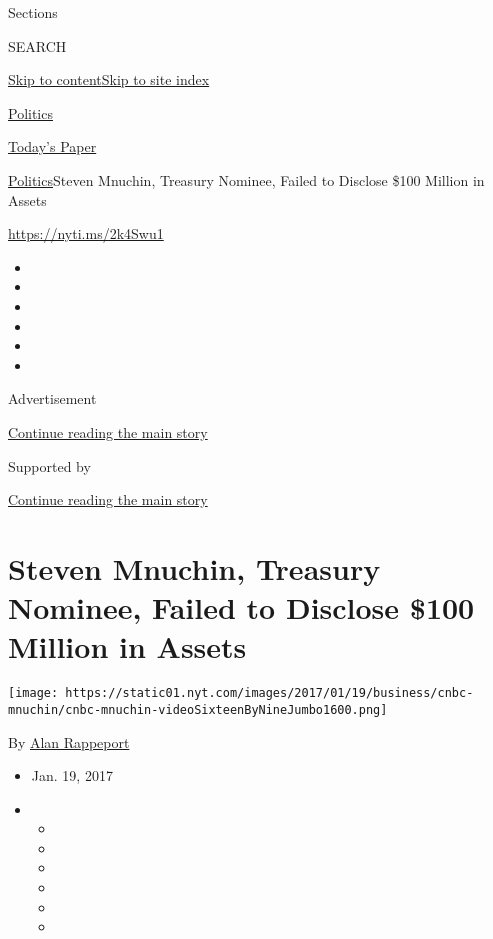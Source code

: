 Sections

SEARCH

\protect\hyperlink{site-content}{Skip to
content}\protect\hyperlink{site-index}{Skip to site index}

\href{https://www.nytimes.com/section/politics}{Politics}

\href{https://myaccount.nytimes.com/auth/login?response_type=cookie\&client_id=vi}{}

\href{https://www.nytimes.com/section/todayspaper}{Today's Paper}

\href{/section/politics}{Politics}\textbar{}Steven Mnuchin, Treasury
Nominee, Failed to Disclose \$100 Million in Assets

\url{https://nyti.ms/2k4Swu1}

\begin{itemize}
\item
\item
\item
\item
\item
\item
\end{itemize}

Advertisement

\protect\hyperlink{after-top}{Continue reading the main story}

Supported by

\protect\hyperlink{after-sponsor}{Continue reading the main story}

\hypertarget{steven-mnuchin-treasury-nominee-failed-to-disclose-100-million-in-assets}{%
\section{Steven Mnuchin, Treasury Nominee, Failed to Disclose \$100
Million in
Assets}\label{steven-mnuchin-treasury-nominee-failed-to-disclose-100-million-in-assets}}

\texttt{[image: https://static01.nyt.com/images/2017/01/19/business/cnbc-mnuchin/cnbc-mnuchin-videoSixteenByNineJumbo1600.png]}

By \href{https://www.nytimes.com/by/alan-rappeport}{Alan Rappeport}

\begin{itemize}
\item
  Jan. 19, 2017
\item
  \begin{itemize}
  \item
  \item
  \item
  \item
  \item
  \item
  \end{itemize}
\end{itemize}

